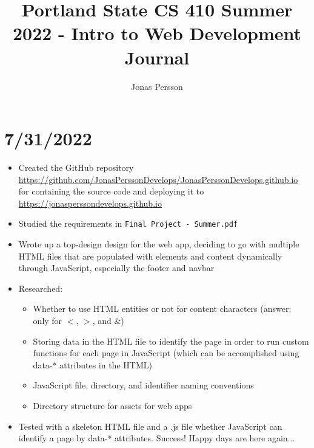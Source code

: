 \documentclass{article}
\begin{document}
	
	\title { Portland State CS 410 Summer 2022 - Intro to Web Development Journal }
	\author {Jonas Persson}
	\maketitle
	
	\newpage


\section*{7/31/2022}
\begin{itemize}
	\item Created the GitHub repository \newline \href{https://github.com/JonasPerssonDevelops/JonasPerssonDevelops.github.io}{https://github.com/JonasPerssonDevelops/JonasPerssonDevelops.github.io} \newline 
	for containing the source code and deploying it to \newline \href{https://jonasperssondevelops.github.io}{https://jonasperssondevelops.github.io}
	\item Studied the requirements in \texttt{Final Project - Summer.pdf}
	\item Wrote up a top-design design for the web app, deciding to go with multiple HTML files that are populated with elements and content dynamically through JavaScript, especially the footer and navbar
	\item Researched:
		\begin{itemize} 
        	\item Whether to use HTML entities or not for content characters (answer: only for $<$, $>$, and \&)
        	\item Storing data in the HTML file to identify the page in order to run custom functions for each page in JavaScript (which can be accomplished using data-* attributes in the HTML)
        	\item JavaScript file, directory, and identifier naming conventions
        	\item Directory structure for assets for web apps
		\end{itemize}
		\item Tested with a skeleton HTML file and a .js file whether JavaScript can identify a page by data-* attributes. Success! Happy days are here again...

\end{itemize}
\end{document}
